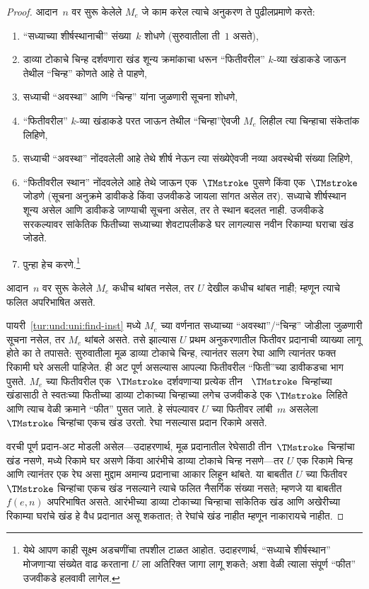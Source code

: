 \begin{proof}
  आदान~$n$ वर सुरू केलेले $M_e$ जे काम
  करेल त्याचे अनुकरण ते पुढीलप्रमाणे करते:
  \begin{enumerate}
    \item “सध्याच्या शीर्षस्थानाची” संख्या~$k$ शोधणे
    (सुरुवातीला ती~$1$ असते),
    \item डाव्या टोकाचे चिन्ह दर्शवणारा खंड शून्य क्रमांकाचा धरून
    “फितीवरील” $k$-व्या खंडाकडे जाऊन
    तेथील “चिन्ह” कोणते आहे ते पाहणे,
    \item\label{tur:und:uni:find-inst}
    सध्याची “अवस्था” आणि “चिन्ह” यांना जुळणारी
    सूचना शोधणे,
    \item “फितीवरील” $k$-व्या खंडाकडे
    परत जाऊन तेथील “चिन्हा”ऐवजी $M_e$ लिहील
    त्या चिन्हाचा संकेतांक लिहिणे,
    \item सध्याची “अवस्था” नोंदवलेली आहे
    तेथे शीर्ष नेऊन त्या संख्येऐवजी नव्या
    अवस्थेची संख्या लिहिणे,
    \item “फितीवरील स्थान” नोंदवलेले आहे
    तेथे जाऊन एक~$\TMstroke$ पुसणे किंवा
    एक~$\TMstroke$ जोडणे (सूचना अनुक्रमे
    डावीकडे किंवा उजवीकडे जायला सांगत असेल तर). सध्याचे
    शीर्षस्थान शून्य असेल आणि डावीकडे जाण्याची सूचना असेल,
    तर ते स्थान बदलत नाही. उजवीकडे सरकल्यावर सांकेतिक फितीच्या
    सध्याच्या शेवटापलीकडे घर लागल्यास नवीन रिकाम्या घराचा खंड जोडते.
    \item पुन्हा हेच करणे.\footnote{येथे आपण काही सूक्ष्म
    अडचणींचा तपशील टाळत आहोत. उदाहरणार्थ,
    “सध्याचे शीर्षस्थान” मोजणाऱ्या संख्येत
    वाढ करताना $U$ ला अतिरिक्त जागा लागू शकते;
    अशा वेळी त्याला संपूर्ण “फीत” उजवीकडे
    हलवावी लागेल.}
  \end{enumerate}
  आदान~$n$ वर सुरू केलेले $M_e$ कधीच थांबत
  नसेल, तर $U$ देखील कधीच थांबत नाही;
  म्हणून त्याचे फलित अपरिभाषित असते.

  पायरी~\ref{tur:und:uni:find-inst} मध्ये $M_e$ च्या
  वर्णनात सध्याच्या “अवस्था”/“चिन्ह” जोडीला
  जुळणारी सूचना नसेल, तर $M_e$ थांबले असते.
  तसे झाल्यास $U$ प्रथम अनुकरणातील फितीवर प्रदानाची व्याख्या
  लागू होते का ते तपासते: सुरुवातीला मूळ डाव्या टोकाचे चिन्ह,
  त्यानंतर सलग रेघा आणि त्यानंतर फक्त रिकामी घरे असली पाहिजेत.
  ही अट पूर्ण असल्यास आपल्या फितीवरील “फिती”च्या
  डावीकडचा भाग पुसते. $M_e$ च्या फितीवरील
  एक~$\TMstroke$ दर्शवणाऱ्या प्रत्येक तीन
  ~$\TMstroke$ चिन्हांच्या खंडासाठी ते
  स्वतःच्या फितीच्या डाव्या टोकाच्या चिन्हाच्या लगेच उजवीकडे एक
  $\TMstroke$ लिहिते आणि त्याच वेळी क्रमाने
  “फीत” पुसत जाते. हे संपल्यावर $U$ च्या
  फितीवर लांबी~$m$ असलेला $\TMstroke$
  चिन्हांचा एकच खंड उरतो. रेघा नसल्यास प्रदान रिकामे असते.

  वरची पूर्ण प्रदान-अट मोडली असेल—उदाहरणार्थ, मूळ प्रदानातील
  रेघेसाठी तीन~$\TMstroke$ चिन्हांचा खंड नसणे, मध्ये रिकामे घर
  असणे किंवा आरंभीचे डाव्या टोकाचे चिन्ह नसणे—तर $U$
  एक रिकामे चिन्ह आणि त्यानंतर एक रेघ असा मुद्दाम अमान्य
  प्रदानाचा आकार लिहून थांबते. या बाबतीत $U$ च्या फितीवर
  $\TMstroke$ चिन्हांचा एकच खंड नसल्याने
  त्याचे फलित नैसर्गिक संख्या नसते; म्हणजे
  या बाबतीत $f(e,n)$ अपरिभाषित असते. आरंभीच्या डाव्या टोकाच्या
  चिन्हाचा सांकेतिक खंड आणि अखेरीच्या रिकाम्या घरांचे खंड
  हे वैध प्रदानात असू शकतात; ते रेघांचे खंड नाहीत म्हणून नाकारायचे नाहीत.

\end{proof}
